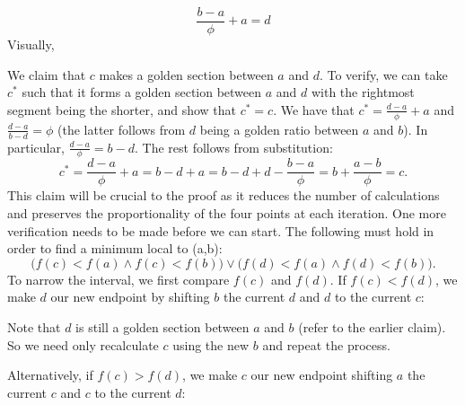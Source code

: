 \documentclass[linenumbers,RNAAS,trackchanges]{aastex631}
\begin{document}
    \[\frac{b - a}{\phi} + a = d\]
Visually,
\begin{center}
\end{center}
We claim that $c$ makes a golden section between $a$ and $d$. To verify, we can take $c^*$ such that it forms a golden section between $a$ and $d$ with the rightmost segment being the shorter, and show that $c^* = c$. We have that $c^* = \frac{d-a}{\phi} + a$ and $\frac{d-a}{b-d} = \phi$ (the latter follows from $d$ being a golden ratio between $a$ and $b$). In particular, $\frac{d-a}{\phi} = b-d$. The rest follows from substitution: $$c^* = \frac{d-a}{\phi} + a= b-d+a = b-d + d-\frac{b-a}{\phi} = b + \frac{a-b}{\phi} = c.$$ 
This claim will be crucial to the proof as it reduces the number of calculations and preserves the proportionality of the four points at each iteration. One more verification needs to be made before we can start. The following must hold in order to find a minimum local to (a,b):
\[\bigl(f(c)<f(a) \land f(c)<f(b)\bigr) \lor \bigl(f(d)<f(a) \land f(d)<f(b)\bigr).\]
 To narrow the interval, we first compare $f(c)$ and $f(d)$. If $f(c) < f(d)$,  we make $d$ our new endpoint by shifting $b$ the current $d$ and $d$ to the current $c$:
    \begin{center}
      \hspace*{1.3cm}
    \end{center}
Note that $d$ is still a golden section between $a$ and $b$ (refer to the earlier claim). So we need only recalculate $c$ using the new $b$ and repeat the process.

Alternatively, if $f(c) > f(d)$,  we make $c$ our new endpoint shifting $a$ the current $c$ and $c$ to the current $d$:
        \begin{center}
    \end{center}
    
\end{document}
